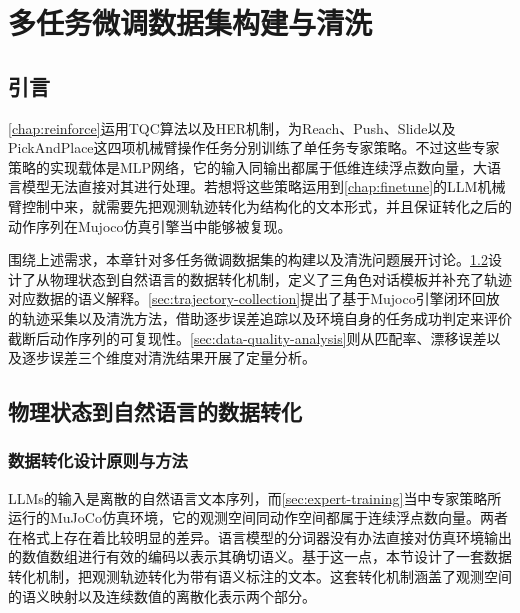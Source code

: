 \chapter{多任务微调数据集构建与清洗}\label{chap:dataset}

\section{引言}\label{sec:dataset-intro}

\cref{chap:reinforce}运用TQC算法以及HER机制，为Reach、Push、Slide以及PickAndPlace这四项机械臂操作任务分别训练了单任务专家策略。不过这些专家策略的实现载体是MLP网络，它的输入同输出都属于低维连续浮点数向量，大语言模型无法直接对其进行处理。若想将这些策略运用到\cref{chap:finetune}的LLM机械臂控制中来，就需要先把观测轨迹转化为结构化的文本形式，并且保证转化之后的动作序列在Mujoco仿真引擎当中能够被复现。

围绕上述需求，本章针对多任务微调数据集的构建以及清洗问题展开讨论。\cref{sec:data-transformation-design}设计了从物理状态到自然语言的数据转化机制，定义了三角色对话模板并补充了轨迹对应数据的语义解释。\cref{sec:trajectory-collection}提出了基于Mujoco引擎闭环回放的轨迹采集以及清洗方法，借助逐步误差追踪以及环境自身的任务成功判定来评价截断后动作序列的可复现性。\cref{sec:data-quality-analysis}则从匹配率、漂移误差以及逐步误差三个维度对清洗结果开展了定量分析。

\section{物理状态到自然语言的数据转化}\label{sec:data-transformation-design}
\subsection{数据转化设计原则与方法}\label{sec:data-transformation}

LLMs的输入是离散的自然语言文本序列，而\cref{sec:expert-training}当中专家策略所运行的MuJoCo仿真环境，它的观测空间同动作空间都属于连续浮点数向量。两者在格式上存在着比较明显的差异。语言模型的分词器没有办法直接对仿真环境输出的数值数组进行有效的编码以表示其确切语义。基于这一点，本节设计了一套数据转化机制，把观测轨迹转化为带有语义标注的文本。这套转化机制涵盖了观测空间的语义映射以及连续数值的离散化表示两个部分。

